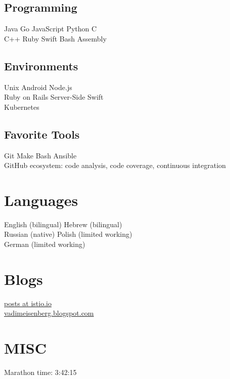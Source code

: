 \documentclass[]{deedy-resume}
\begin{document}
\begin{minipage}[t]{0.33\textwidth}
\subsection{Programming}
Java \textbullet{} Go \textbullet{} JavaScript \textbullet{} Python \textbullet{} C\\
C++ \textbullet{} Ruby  \textbullet{}  Swift \textbullet{} Bash \textbullet{}  Assembly
\sectionsep

\subsection{Environments}
Unix \textbullet{}  Android \textbullet{}  Node.js \\
Ruby on Rails \textbullet{} Server-Side Swift \\
Kubernetes
\sectionsep

\subsection{Favorite Tools}
Git \textbullet{}  Make \textbullet{}  Bash \textbullet{} Ansible \textbullet{} \\
GitHub ecosystem: code analysis, code coverage, continuous integration
\sectionsep

\section{Languages}
\vspace{\topsep} %
English (bilingual) \textbullet{} Hebrew (bilingual) \\
Russian (native)  \textbullet{} Polish (limited working) \\
German (limited working)
\sectionsep

\sectionsep

\section{Blogs}
\href{https://istio.io/search.html?q=vadim\%20eisenberg}{posts at istio.io} \\
\href{http://vadimeisenberg.blogspot.com}{vadimeisenberg.blogspot.com}
\sectionsep

\sectionsep

\section{MISC}
Marathon time: 3:42:15

%
%

\end{minipage}
\end{document}
